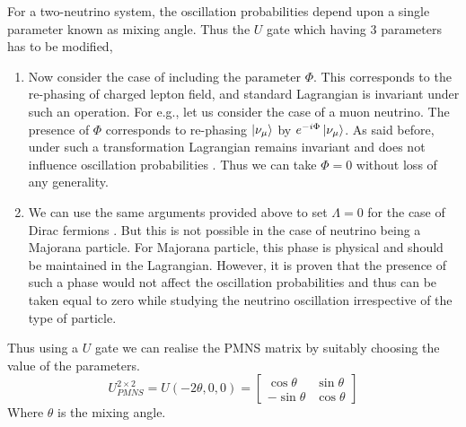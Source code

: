\documentclass[12pt,a4paper]{report}
\begin{document}
For a two-neutrino system, the oscillation probabilities depend upon a single parameter known as mixing angle. Thus the $U$ gate which having $3$ parameters has to be modified,
\begin{enumerate}
	\item Now consider the case of including the parameter $\Phi$. This corresponds to the re-phasing of charged lepton field, and standard Lagrangian is invariant under such an operation. For e.g., let us consider the case of a muon neutrino. The presence of $\Phi$ corresponds to re-phasing $\ket{\nu_{\mu}}$ by $e^{-i\Phi}\ket{\nu_{\mu}}$. As said before, under such a transformation Lagrangian remains invariant and does not influence oscillation probabilities \cite{giunti2007}. Thus we can take $\Phi=0$ without loss of any generality.
	\item We can use the same arguments provided above to set $\Lambda = 0$ for the case of Dirac fermions \cite{giunti2007}. But this is not possible in the case of neutrino being a Majorana particle. For Majorana particle, this phase is physical and should be maintained in the Lagrangian. However, it is proven that the presence of such a phase would not affect the oscillation probabilities \cite{giunti2010} and thus can be taken equal to zero while studying the neutrino oscillation irrespective of the type of particle.
\end{enumerate}
Thus using a $U$ gate we can realise the PMNS matrix by suitably choosing the value of the parameters. 
\begin{equation}
\label{eq:16}
U_{PMNS}^{2\times2} = U(-2\theta,0,0) = \begin{bmatrix} \cos\theta & \sin\theta \\ -\sin\theta & 
\cos\theta \end{bmatrix}
\end{equation}
Where $\theta$ is the mixing angle.\par
\end{document}
